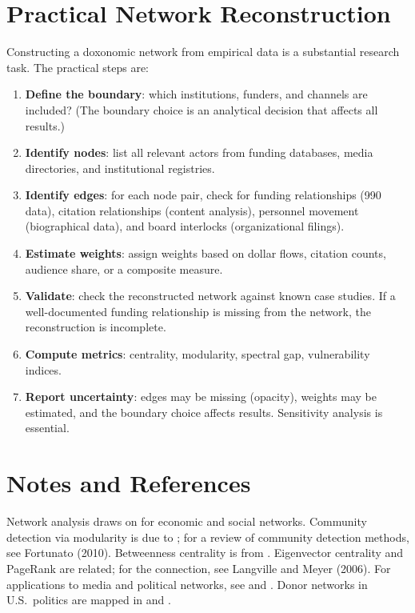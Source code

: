 \section{Practical Network Reconstruction}
\label{sec:ch15-practical}

Constructing a doxonomic network from empirical data is a substantial research task.
The practical steps are:

\begin{enumerate}[nosep]
  \item \textbf{Define the boundary}: which institutions, funders, and channels are included? (The boundary choice is an analytical decision that affects all results.)
  \item \textbf{Identify nodes}: list all relevant actors from funding databases, media directories, and institutional registries.
  \item \textbf{Identify edges}: for each node pair, check for funding relationships (990 data), citation relationships (content analysis), personnel movement (biographical data), and board interlocks (organizational filings).
  \item \textbf{Estimate weights}: assign weights based on dollar flows, citation counts, audience share, or a composite measure.
  \item \textbf{Validate}: check the reconstructed network against known case studies.
  If a well-documented funding relationship is missing from the network, the reconstruction is incomplete.
  \item \textbf{Compute metrics}: centrality, modularity, spectral gap, vulnerability indices.
  \item \textbf{Report uncertainty}: edges may be missing (opacity), weights may be estimated, and the boundary choice affects results.
  Sensitivity analysis is essential.
\end{enumerate}


\section{Notes and References}
\label{sec:ch15-notes}

Network analysis draws on \textcite{jackson2008} for economic and social networks.
Community detection via modularity is due to \textcite{newman2006}; for a review of community detection methods, see Fortunato (2010).
Betweenness centrality is from \textcite{freeman1977}.
Eigenvector centrality and PageRank are related; for the connection, see Langville and Meyer (2006).
For applications to media and political networks, see \textcite{watts2002} and \textcite{benkler2018}.
Donor networks in U.S.\ politics are mapped in \textcite{mayer2016} and \textcite{phillipsfein2009}.

